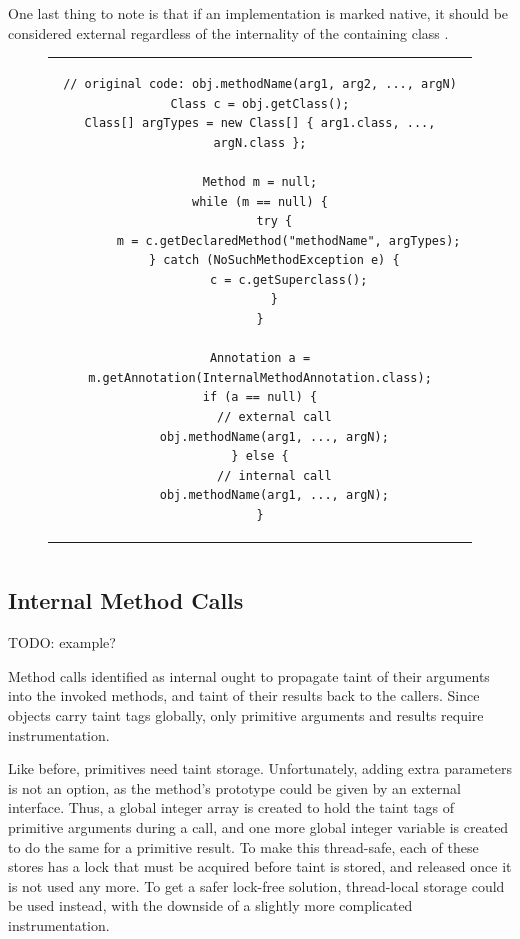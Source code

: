 \documentclass[12pt,twoside,notitlepage]{report}
\begin{document}
One last thing to note is that if an implementation is marked native, it should be considered external regardless of the internality of the containing class
.
\begin{figure}[h]
	\centering
	\begin{tabular}{c}
	\begin{lstlisting}
// original code: obj.methodName(arg1, arg2, ..., argN)
Class c = obj.getClass();
Class[] argTypes = new Class[] { arg1.class, ..., argN.class };

Method m = null;
while (m == null) {
	try {
 		m = c.getDeclaredMethod("methodName", argTypes);
 	} catch (NoSuchMethodException e) {
 		c = c.getSuperclass();
 	}
}

Annotation a = m.getAnnotation(InternalMethodAnnotation.class);
if (a == null) {
	// external call
	obj.methodName(arg1, ..., argN);
} else {
	// internal call
	obj.methodName(arg1, ..., argN);
}
	\end{lstlisting}
	\end{tabular}
	\begin{lstlisting}[caption={Destination-deciding instrumentation for non-public methods},
	                   label={listing:TaintPropagation_MethodCall_DestDecidability_NonPublic}]
	\end{lstlisting}
\end{figure}

\subsection{Internal Method Calls}
\label{section:TaintPropagation_MethodCalls_Internal}

TODO: example?

Method calls identified as internal ought to propagate taint of their arguments into the invoked methods, and taint of their results back to the callers. Since objects carry taint tags globally, only primitive arguments and results require instrumentation. 

Like before, primitives need taint storage. Unfortunately, adding extra parameters is not an option, as the method's prototype could be given by an external interface. Thus, a global integer array is created to hold the taint tags of primitive arguments during a call, and one more global integer variable is created to do the same for a primitive result. To make this thread-safe, each of these stores has a lock that must be acquired before taint is stored, and released once it is not used any more. To get a safer lock-free solution, thread-local storage could be used instead, with the downside of a slightly more complicated instrumentation.
\end{document}
